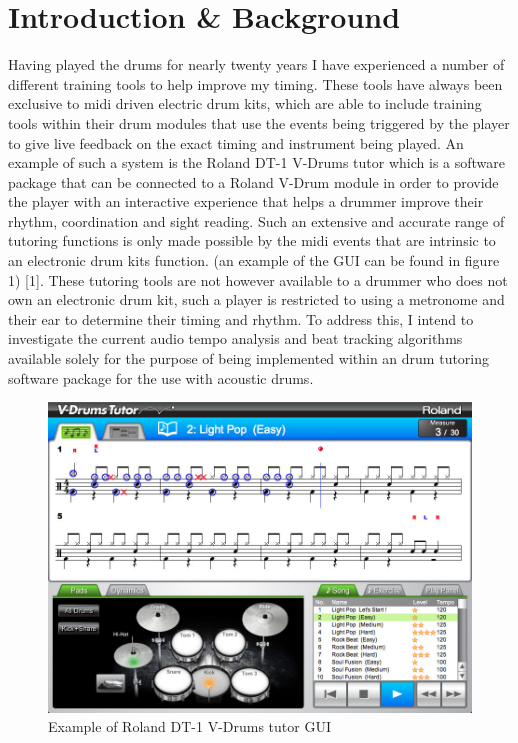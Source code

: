 \documentclass[a4paper, 11pt]{article}
\begin{document}
 

\maketitle
\newpage
\tableofcontents
\clearpage

\maketitle{} \section{Introduction \& Background}
Having played the drums for nearly twenty years I have experienced a number of different training tools to help improve my timing. These tools have always been exclusive to midi driven electric drum kits, which are able to include training tools within their drum modules that use the events being triggered by the player to give live feedback on the exact timing and instrument being played. An example of such a system is the Roland DT-1 V-Drums tutor which is a software package that can be connected to a Roland V-Drum module in order to provide the player with an interactive experience that helps a drummer improve their rhythm, coordination and sight reading. Such an extensive and accurate range of tutoring functions is only made possible by the midi events that are intrinsic to an electronic drum kits function. (an example of the GUI can be found in figure 1) [1]. These tutoring tools are not however available to a drummer who does not own an electronic drum kit, such a player is restricted to using a metronome and their ear to determine their timing and rhythm. To address this, I intend to investigate the current audio tempo analysis and beat tracking algorithms available solely for the purpose of being implemented within an drum tutoring software package for the use with acoustic drums.
\begin{figure}[h]
\caption{Example of Roland DT-1 V-Drums tutor GUI}
	\centering
	\includegraphics[scale=0.25]{dt-1_ss_main_notation_gal}
\end{figure}
\end{document}
